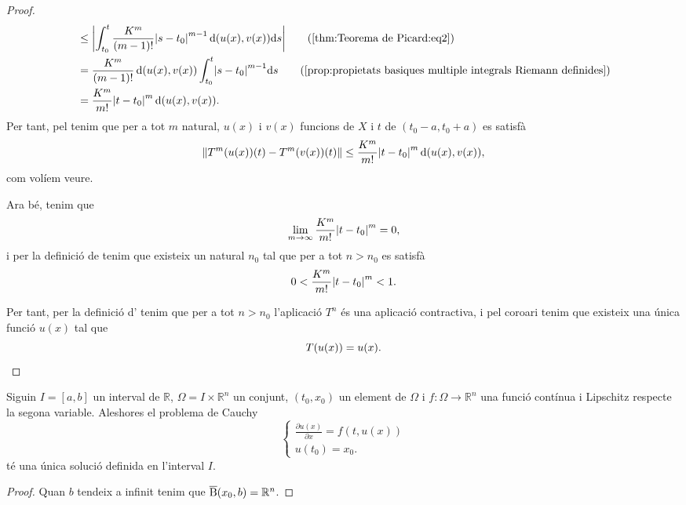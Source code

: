 \documentclass[../Apunts.tex]{subfiles}
\begin{document}
\begin{theorem}
\begin{proof}
\begin{align*}
				&\leq\abs{\int_{t_{0}}^{t}\frac{K^{m}}{(m-1)!}\abs{s-t_{0}}^{m-1}\distancia(u(x),v(x))\diff s}\tag{\ref{thm:Teorema de Picard:eq2}}\\
				&=\frac{K^{m}}{(m-1)!}\distancia(u(x),v(x))\int_{t_{0}}^{t}\abs{s-t_{0}}^{m-1}\diff s\tag{\ref{prop:propietats basiques multiple integrals Riemann definides}}\\
				&=\frac{K^{m}}{m!}\abs{t-t_{0}}^{m}\distancia(u(x),v(x)).%
			\end{align*}
			Per tant, pel  tenim que per a tot \(m\) natural, \(u(x)\) i \(v(x)\) funcions de \(X\) i \(t\) de \((t_{0}-a,t_{0}+a)\) es satisfà
			\[\norm{T^{m}(u(x))(t)-T^{m}(v(x))(t)}\leq\frac{K^{m}}{m!}\abs{t-t_{0}}^{m}\distancia(u(x),v(x)),\]
			com volíem veure.
			
			Ara bé, tenim que
			\[\lim_{m\to\infty}\frac{K^{m}}{m!}\abs{t-t_{0}}^{m}=0,\]%
			i per la definició de  tenim que existeix un natural \(n_{0}\) tal que per a tot \(n>n_{0}\) es satisfà
			\[0<{\frac{K^{m}}{m!}\abs{t-t_{0}}^{m}}<1.\]
			
			Per tant, per la definició d' tenim que per a tot \(n>n_{0}\) l'aplicació \(T^{n}\) és una aplicació contractiva, i pel coro{\lgem}ari  tenim que existeix una única funció \(u(x)\) tal que
			\[T(u(x))=u(x).\qedhere\]
		\end{proof}
	\end{theorem}
	\begin{corollary}
		\label{cor:Teorema de Picard}
		Siguin \(I=[a,b]\) un interval de \(\mathbb{R}\), \(\Omega=I\times\mathbb{R}^{n}\) un conjunt, \((t_{0},x_{0})\) un element de \(\Omega\) i \(f\colon\Omega\longrightarrow\mathbb{R}^{n}\) una funció contínua i Lipschitz respecte la segona variable. Aleshores el problema de Cauchy
		\[\begin{cases*}
			\displaystyle \frac{\partial u(x)}{\partial x}=f(t,u(x)) \\
			\displaystyle u(t_{0})=x_{0}.
		\end{cases*}\]
		té una única solució definida en l'interval \(I\).
		\begin{proof}
			Quan \(b\) tendeix a infinit tenim que \(\overline{\operatorname{B}}(x_{0},b)=\mathbb{R}^{n}\).
		\end{proof}
	\end{corollary}
\end{document}
